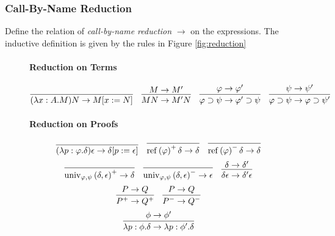 \documentclass[a4paper,UKenglish]{lipics-v2016}
\newcommand*{\reff}[1]{\ensuremath{\mathrm{ref} \left( {#1} \right)}}
\newcommand*{\univ}[4]{\ensuremath{\mathrm{univ}_{{#1}, {#2}} \left({#3} , {#4} \right)}}
\theoremstyle{plain}
\theoremstyle{definition}
\begin{document}
\subsubsection{Call-By-Name Reduction}

\begin{definition}
Define the relation of \emph{call-by-name reduction} $\rightarrow$ on the expressions.  The inductive
definition is given by the rules in Figure \ref{fig:reduction}

\begin{figure}
\paragraph*{Reduction on Terms}
$$ \infer{(\lambda x:A.M)N \rightarrow M[x:=N]}{} \quad
\infer{MN \rightarrow M'N}{M \rightarrow M'} \quad
\infer{\varphi \supset \psi \rightarrow \varphi' \supset \psi}{\varphi \rightarrow \varphi'} \quad
\infer{\varphi \supset \psi \rightarrow \varphi \supset \psi'}{\psi \rightarrow \psi'} $$
\paragraph*{Reduction on Proofs}
$$\infer{(\lambda p : \varphi . \delta)\epsilon \rightarrow \delta [ p := \epsilon ]}{} \quad
\infer{\reff{\varphi}^+ \delta \rightarrow \delta}{} \quad
\infer{\reff{\varphi}^- \delta \rightarrow \delta}{} $$
$$ \infer{\univ{\varphi}{\psi}{\delta}{\epsilon}^+ \rightarrow \delta}{} \quad
\infer{\univ{\varphi}{\psi}{\delta}{\epsilon}^- \rightarrow \epsilon}{} \quad
\infer{\delta \epsilon \rightarrow \delta' \epsilon}{\delta \rightarrow \delta'} $$
$$ \infer{P^+ \rightarrow Q^+}{P \rightarrow Q} \quad
\infer{P^- \rightarrow Q^-}{P \rightarrow Q}$$
$$ \infer{\lambda p:\phi.\delta \rightarrow \lambda p:\phi'.\delta}{\phi \rightarrow \phi'} $$

\end{figure}
\end{definition}
\end{document}

